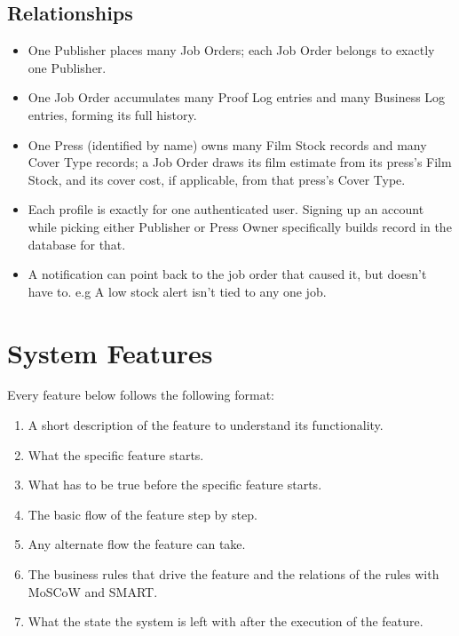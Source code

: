 \documentclass{scrreprt}
\begin{document}
\section{Relationships}
\begin{itemize}
\item One Publisher places many Job Orders; each Job Order belongs to exactly one Publisher.
\item One Job Order accumulates many Proof Log entries and many Business Log entries, forming its full history.
\item One Press (identified by name) owns many Film Stock records and many Cover Type records; a Job Order draws its film estimate from its press's Film Stock, and its cover cost, if applicable, from that press's Cover Type.
\item Each profile is exactly for one authenticated user. Signing up an account while picking either Publisher or Press Owner specifically builds record in the database for that.
\item A notification can point back to the job order that caused it, but doesn't have to. e.g A low stock alert isn't tied to any one job.
\end{itemize}

\chapter{System Features}
Every feature below follows the following format:
\begin{enumerate}
\item A short description of the feature to understand its functionality.
\item What the specific feature starts.
\item What has to be true before the specific feature starts.
\item The basic flow of the feature step by step.
\item Any alternate flow the feature can take.
\item The business rules that drive the feature and the relations of the rules with MoSCoW and SMART.
\item What the state the system is left with after the execution of the feature.
\end{enumerate}

\end{document}
